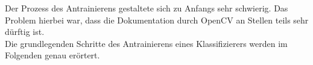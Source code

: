 Der Prozess des Antrainierens gestaltete sich zu Anfangs sehr schwierig. Das Problem hierbei war, dass die Dokumentation durch OpenCV an Stellen teils sehr dürftig ist. \\
Die grundlegenden Schritte des Antrainierens eines Klassifizierers werden im Folgenden genau erörtert.
\label{sec:Antrainieren}